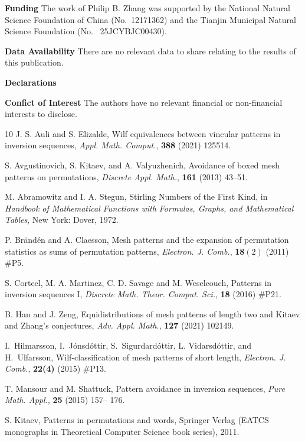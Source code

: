 \documentclass[12pt]{article}
\begin{document}
\noindent \textbf{Funding} The work of Philip B. Zhang was supported by the National Natural Science Foundation of China (No.~12171362) and the Tianjin Municipal Natural Science Foundation (No.~ 25JCYBJC00430).

\noindent \textbf{Data Availability} There are no relevant data to share relating to the results of this publication.

\noindent \textbf{Declarations}

\noindent  \textbf{Confict of Interest} The authors have no relevant financial or non-financial interests to disclose.




\begin{thebibliography}{10}
 J. S. Auli and S. Elizalde, Wilf equivalences between vincular patterns in inversion sequences, {\em Appl. Math. Comput.}, {\bf 388} (2021) 125514.

 S. Avgustinovich, S. Kitaev, and A. Valyuzhenich, Avoidance of boxed mesh patterns on permutations, {\em Discrete Appl. Math.}, {\bf 161} (2013) 43--51.

  M. Abramowitz and I. A. Stegun, Stirling Numbers of the First Kind,  in {\em Handbook of Mathematical Functions with Formulas, Graphs, and Mathematical Tables},  New York: Dover, 1972. 

 P. Br\"and\'en and A. Claesson, Mesh patterns and the expansion of permutation statistics as sums of permutation patterns, {\em Electron. J. Comb.}, {\bf 18$(2)$} (2011) \#P5. 

 S. Corteel, M. A. Martinez, C. D. Savage and M. Weselcouch, Patterns in inversion sequences I,
 {\em Discrete Math. Theor. Comput. Sci.}, {\bf 18} (2016) \#P21.

 B. Han and J. Zeng, Equidistributions of mesh patterns of length two and {Kitaev} and {Zhang}'s conjectures, {\em Adv. Appl. Math.}, {\bf 127} (2021) 102149.

I.~Hilmarsson, I.~J\'onsd\'ottir, S.~Sigurdard\'ottir, L. Vidarsd\'ottir, and H.~Ulfarsson, Wilf-classification of mesh patterns of short length,
  {\em Electron. J. Comb.}, {\bf 22(4)} (2015)  \#P13.
  
 T. Mansour and M. Shattuck, Pattern avoidance in inversion sequences, {\em Pure Math. Appl.}, {\bf 25} (2015) 157--
176.

 S. Kitaev, Patterns in permutations and words, Springer Verlag (EATCS monographs in Theoretical Computer Science book series), 2011.



\end{thebibliography}
\end{document}
